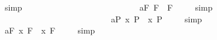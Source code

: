 \begin{isabellebody}
%
\isatagproof
{}\isamarkupfalse%
\ simp\ \isamarkupfalse%
%
\endisatagproof
{\isafoldproof}%
%
\isadelimproof
%
\endisadelimproof
\ \ \ \ \ \ \ \ \ \ \ \ \ \ \ \ \ \ \ \ \ \ \ \isanewline
\ \isamarkupfalse%
\ a{}{}{\isacharunderscore}{}{\isacharunderscore}F{\isacharcolon}\ {\isachardoublequoteopen}{\isacharbrackleft}\isactrlbold {\isasymbox}\isactrlbold {\isasymdiamond}{\isasymphi}\isactrlsup F\ \isactrlbold {\isasymrightarrow}\ \isactrlbold {\isasymdiamond}{\isasymphi}\isactrlsup F{\isacharbrackright}\ {\isacharequal}\ {\isasymtop}{\isachardoublequoteclose}%
\isadelimproof
\ %
\endisadelimproof
%
\isatagproof
{}\isamarkupfalse%
\ simp\ \isamarkupfalse%
%
\endisatagproof
{\isafoldproof}%
%
\isadelimproof
%
\endisadelimproof
\ \ \ \ \ \ \ \ \ \ \ \ \ \ \ \ \ \ \ \ \ \ \ \isanewline
\ \isamarkupfalse%
\ a{}{}{\isacharunderscore}{}{\isacharunderscore}P{\isacharcolon}\ {\isachardoublequoteopen}{\isacharbrackleft}{\isacharparenleft}\isactrlbold {\isasymforall}x{\isachardot}\ \isactrlbold {\isasymbox}{\isasymphi}\isactrlsup P{\isacharparenright}\ \isactrlbold {\isasymrightarrow}\ \isactrlbold {\isasymbox}{\isacharparenleft}{\isacharparenleft}\isactrlbold {\isasymforall}x{\isachardot}\ {\isasymphi}\isactrlsup P{\isacharparenright}{\isacharparenright}{\isacharbrackright}\ {\isacharequal}\ {\isasymtop}{\isachardoublequoteclose}%
\isadelimproof
\ %
\endisadelimproof
%
\isatagproof
{}\isamarkupfalse%
\ simp\ \isamarkupfalse%
%
\endisatagproof
{\isafoldproof}%
%
\isadelimproof
%
\endisadelimproof
\ \ \ \ \ \ \ \ \ \isanewline
\ \isamarkupfalse%
\ a{}{}{\isacharunderscore}{}{\isacharunderscore}F{\isacharcolon}\ {\isachardoublequoteopen}{\isacharbrackleft}{\isacharparenleft}\isactrlbold {\isasymforall}x{\isachardot}\ \isactrlbold {\isasymbox}{\isasymphi}\isactrlsup F{\isacharparenright}\ \isactrlbold {\isasymrightarrow}\ \isactrlbold {\isasymbox}{\isacharparenleft}{\isacharparenleft}\isactrlbold {\isasymforall}x{\isachardot}\ {\isasymphi}\isactrlsup F{\isacharparenright}{\isacharparenright}{\isacharbrackright}\ {\isacharequal}\ {\isasymtop}{\isachardoublequoteclose}%
\isadelimproof
\ %
\endisadelimproof
%
\isatagproof
{}\isamarkupfalse%
\ simp\ \isamarkupfalse%
%
\endisatagproof
{\isafoldproof}%
%
\isadelimproof
%
\endisadelimproof
%
\begin{isamarkuptext}%

\end{isamarkuptext}
\end{isabellebody}
